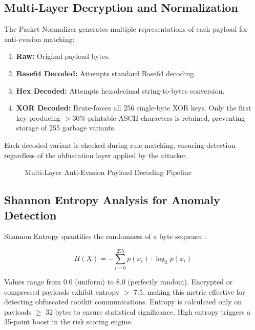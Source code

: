 \subsection{Multi-Layer Decryption and Normalization}

The Packet Normalizer generates multiple representations of each payload for anti-evasion matching:

\begin{enumerate}
    \item \textbf{Raw:} Original payload bytes.
    \item \textbf{Base64 Decoded:} Attempts standard Base64 decoding.
    \item \textbf{Hex Decoded:} Attempts hexadecimal string-to-bytes conversion.
    \item \textbf{XOR Decoded:} Brute-forces all 256 single-byte XOR keys. Only the first key producing $>$30\% printable ASCII characters is retained, preventing storage of 255 garbage variants.
\end{enumerate}

Each decoded variant is checked during rule matching, ensuring detection regardless of the obfuscation layer applied by the attacker.

\begin{figure}[h]
\centering
{}
\caption{Multi-Layer Anti-Evasion Payload Decoding Pipeline}
\label{fig:antievasion_pipeline}
\end{figure}

\subsection{Shannon Entropy Analysis for Anomaly Detection}

Shannon Entropy quantifies the randomness of a byte sequence \cite{shannon1948}:

\begin{equation}
H(X) = -\sum_{i=0}^{255} p(x_i) \cdot \log_2 p(x_i)
\end{equation}

Values range from 0.0 (uniform) to 8.0 (perfectly random). Encrypted or compressed payloads exhibit entropy $>$ 7.5, making this metric effective for detecting obfuscated rootkit communications. Entropy is calculated only on payloads $\geq$ 32 bytes to ensure statistical significance. High entropy triggers a 35-point boost in the risk scoring engine.

